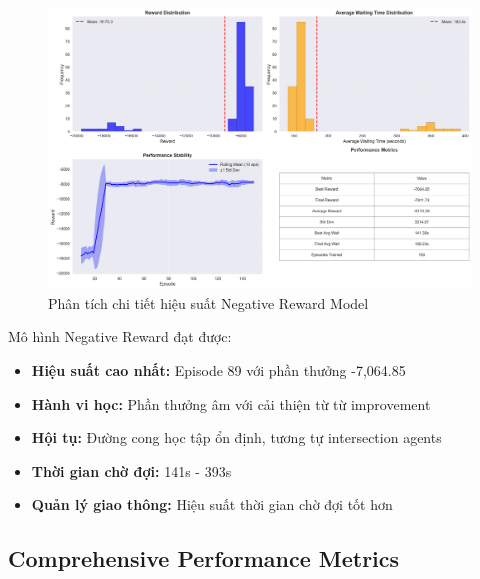 \begin{figure}[!htp]
    \centering
    \includegraphics[width=\textwidth]{figures/sync_negative_model_summary.png}
    \caption{Phân tích chi tiết hiệu suất Negative Reward Model}
    \label{fig:sync_negative_model_summary}
\end{figure}

Mô hình Negative Reward đạt được:
\begin{itemize}
    \item \textbf{Hiệu suất cao nhất:} Episode 89 với phần thưởng -7,064.85

    \item \textbf{Hành vi học:} Phần thưởng âm với cải thiện từ từ
        improvement

    \item \textbf{Hội tụ:} Đường cong học tập ổn định, tương tự intersection agents

    \item \textbf{Thời gian chờ đợi:} 141s - 393s

    \item \textbf{Quản lý giao thông:} Hiệu suất thời gian chờ đợi tốt hơn
\end{itemize}

\subsection{Comprehensive Performance Metrics}

